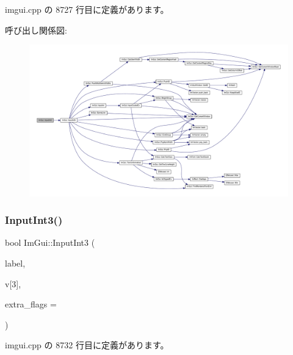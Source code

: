  imgui.\+cpp の 8727 行目に定義があります。

呼び出し関係図\+:\nopagebreak
\begin{figure}[H]
\begin{center}
\leavevmode
\includegraphics[width=350pt]{namespace_im_gui_a4142cc4545d789d76d51dee61c959a03_cgraph}
\end{center}
\end{figure}
\mbox{\label{namespace_im_gui_ab02fc4a19ed153984d3585296e1c74b1}} 
\subsubsection{\texorpdfstring{Input\+Int3()}{InputInt3()}}
{\footnotesize\ttfamily bool Im\+Gui\+::\+Input\+Int3 (\begin{DoxyParamCaption}\item[{const char $\ast$}]{label,  }\item[{int}]{v\mbox{[}3\mbox{]},  }\item[{\mbox{\hyperlink{imgui_8h_a7d2c6153a6b9b5d3178ce82434ac9fb8}{Im\+Gui\+Input\+Text\+Flags}}}]{extra\+\_\+flags = {} }\end{DoxyParamCaption})}



 imgui.\+cpp の 8732 行目に定義があります。

